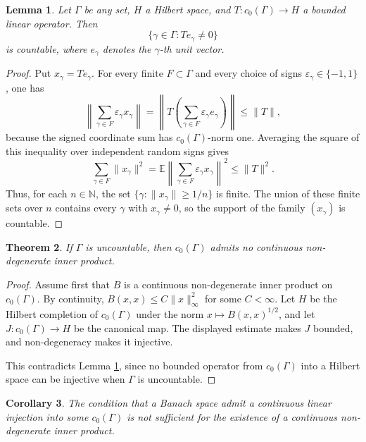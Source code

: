 \documentclass[11pt]{article}
\newtheorem{theorem}{Theorem}
\newtheorem{lemma}[theorem]{Lemma}
\newtheorem{corollary}[theorem]{Corollary}
\theoremstyle{remark}
\newcommand{\cnull}{c_0}
\newcommand{\GammaSet}{\Gamma}
\newcommand{\N}{\mathbb N}
\begin{document}
\begin{lemma}\label{lem:operator}
Let \(\GammaSet\) be any set, \(H\) a Hilbert space, and
\(T:\cnull(\GammaSet)\to H\) a bounded linear operator.  Then
\[
  \{\gamma\in\GammaSet: T e_\gamma\neq 0\}
\]
is countable, where \(e_\gamma\) denotes the \(\gamma\)-th unit vector.
\end{lemma}

\begin{proof}
Put \(x_\gamma=T e_\gamma\).  For every finite \(F\subset\GammaSet\) and every
choice of signs \(\varepsilon_\gamma\in\{-1,1\}\), one has
\[
  \left\|\sum_{\gamma\in F}\varepsilon_\gamma x_\gamma\right\|
  =
  \left\|T\left(\sum_{\gamma\in F}\varepsilon_\gamma e_\gamma\right)\right\|
  \leq \|T\|,
\]
because the signed coordinate sum has \(\cnull(\GammaSet)\)-norm one.
Averaging the square of this inequality over independent random signs gives
\[
  \sum_{\gamma\in F}\|x_\gamma\|^2
  =
  \mathbb E\left\|\sum_{\gamma\in F}\varepsilon_\gamma x_\gamma\right\|^2
  \leq \|T\|^2.
\]
Thus, for each \(n\in\N\), the set
\(\{\gamma:\|x_\gamma\|\geq 1/n\}\) is finite.  The union of these finite sets
over \(n\) contains every \(\gamma\) with \(x_\gamma\neq 0\), so the support of
the family \((x_\gamma)\) is countable.
\end{proof}

\begin{theorem}\label{thm:c0}
If \(\GammaSet\) is uncountable, then \(\cnull(\GammaSet)\) admits no
continuous non-degenerate inner product.
\end{theorem}

\begin{proof}
Assume first that \(B\) is a continuous non-degenerate inner product on
\(\cnull(\GammaSet)\).  By continuity, \(B(x,x)\leq C\|x\|_\infty^2\) for some
\(C<\infty\).  Let \(H\) be the Hilbert completion of
\(\cnull(\GammaSet)\) under the norm \(x\mapsto B(x,x)^{1/2}\), and let
\(J:\cnull(\GammaSet)\to H\) be the canonical map.  The displayed estimate
makes \(J\) bounded, and non-degeneracy makes it injective.

This contradicts Lemma \ref{lem:operator}, since no bounded operator from
\(\cnull(\GammaSet)\) into a Hilbert space can be injective when
\(\GammaSet\) is uncountable.
\end{proof}

\begin{corollary}
The condition that a Banach space admit a continuous linear injection into
some \(\cnull(\GammaSet)\) is not sufficient for the existence of a continuous
non-degenerate inner product.
\end{corollary}
\end{document}
